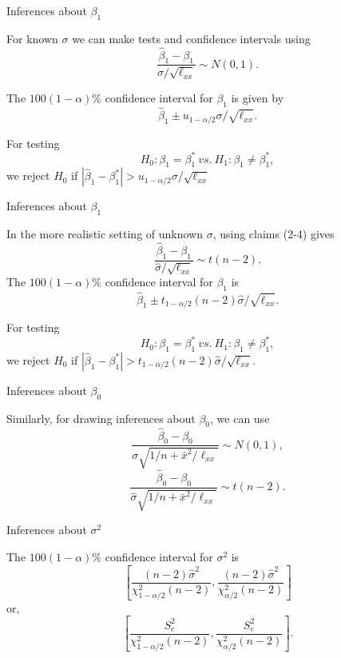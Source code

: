 \documentclass[ignorenonframetext,]{beamer}
\begin{document}
\begin{frame}{Inferences about \(\beta_1\)}
\protect\hypertarget{inferences-about-beta_1}{}

For known \(\sigma\) we can make tests and confidence intervals using
\[\frac{\hat\beta_1-\beta_1}{\sigma/\sqrt{\ell_{xx}}}\sim N(0,1).\]

The \(100(1-\alpha)\%\) confidence interval for \(\beta_1\) is given by
\[\hat\beta_1\pm u_{1-\alpha/2}\sigma/\sqrt{\ell_{xx}}.\]

For testing \[H_0:\beta_1=\beta_1^*\ vs.\ H_1:\beta_1\neq\beta_1^*,\] we
reject \(H_0\) if
\(|\hat\beta_1-\beta_1^*|>u_{1-\alpha/2}\sigma/\sqrt{\ell_{xx}}\)

\end{frame}

\begin{frame}{Inferences about \(\beta_1\)}
\protect\hypertarget{inferences-about-beta_1-1}{}

In the more realistic setting of unknown \(\sigma\), using claims (2-4)
gives
\[\frac{\hat\beta_1-\beta_1}{\hat{\sigma}/\sqrt{\ell_{xx}}}\sim t(n-2).\]
The \(100(1-\alpha)\%\) confidence interval for \(\beta_1\) is
\[\hat\beta_1\pm t_{1-\alpha/2}(n-2)\hat{\sigma}/\sqrt{\ell_{xx}}.\]

For testing \[H_0:\beta_1=\beta_1^*\ vs.\ H_1:\beta_1\neq\beta_1^*,\] we
reject \(H_0\) if
\(|\hat\beta_1-\beta_1^*|>t_{1-\alpha/2}(n-2)\hat\sigma/\sqrt{\ell_{xx}}\).

\end{frame}

\begin{frame}{Inferences about \(\beta_0\)}
\protect\hypertarget{inferences-about-beta_0}{}

Similarly, for drawing inferences about \(\beta_0\), we can use
\[\frac{\hat\beta_0-\beta_0}{\sigma\sqrt{1/n+\bar x^2/\ell_{xx}}}\sim N(0,1),\]
\[\frac{\hat\beta_0-\beta_0}{\hat\sigma\sqrt{1/n+\bar x^2/\ell_{xx}}}\sim t(n-2).\]

\end{frame}

\begin{frame}{Inferences about \(\sigma^2\)}
\protect\hypertarget{inferences-about-sigma2}{}

The \(100(1-\alpha)\%\) confidence interval for \(\sigma^2\) is
\[\left[\frac{(n-2)\hat\sigma^2}{\chi_{1-\alpha/2}^2(n-2)},\frac{(n-2)\hat\sigma^2}{\chi_{\alpha/2}^2(n-2)}\right]\]
or,
\[\left[\frac{S_e^2}{\chi_{1-\alpha/2}^2(n-2)},\frac{S_e^2}{\chi_{\alpha/2}^2(n-2)}\right].\]

\end{frame}
\end{document}
